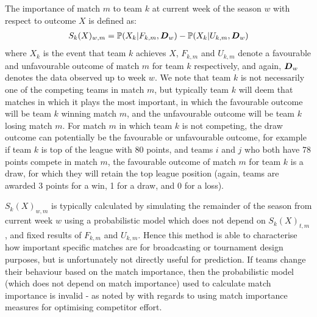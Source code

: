 The importance of match \(m\) to team \(k\) at current week of the season \(w\) with respect to outcome \(X\) is defined
as:
\begin{align} 
S_k(X)_{w, m} = \mathbb{P}(X_k | F_{k, m}, \boldsymbol{D}_w) - \mathbb{P}(X_k | U_{k, m}, \boldsymbol{D}_w)
\end{align}
where \(X_k\) is the event that team \(k\) achieves \(X\), \(F_{k, m}\) and \(U_{k, m}\) denote a favourable and
unfavourable outcome of match \(m\) for team \(k\) respectively, and again, \(\boldsymbol{D}_w\) denotes the data observed up to
week \(w\). We note that team \(k\) is not necessarily one of the competing teams in match \(m\), but typically team
\(k\) will deem that matches in which it plays the most important, in which the favourable outcome will be team \(k\)
winning match \(m\), and the unfavourable outcome will be team \(k\) losing match \(m\). For match \(m\) in which team
\(k\) is not competing, the draw outcome can potentially be the favourable or unfavourable outcome, for example if
team \(k\) is top of the league with 80 points, and teams \(i\) and \(j\) who both have 78 points compete in match
\(m\), the favourable outcome of match \(m\) for team \(k\) is a draw, for which they will retain the top league
position (again, teams are awarded 3 points for a win, 1 for a draw, and 0 for a loss).

\(S_k(X)_{w, m}\) is typically calculated by simulating the remainder of the season from current week \(w\) using a
probabilistic model which does not depend on \(S_k(X)_{t, m}\), and fixed results of \(F_{k, m}\) and \(U_{k, m}\).
Hence this method is able to characterise how important specific matches are for broadcasting or tournament design
purposes, but is unfortunately not directly useful for prediction. If teams change their behaviour based on the match
importance, then the probabilistic model (which does not depend on match importance) used to calculate match importance
is invalid - as noted by \cite{scarf2008} with regards to using match importance measures for optimising competitor
effort.

